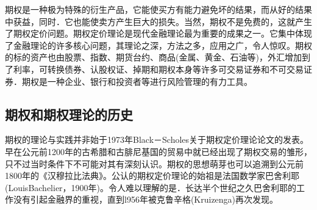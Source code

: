 期权是一种极为特殊的衍生产品，它能使买方有能力避免坏的结果，而从好的结果中获益，同时．它也能使卖方产生巨大的损失。当然，期权不是免费的，这就产生了期权定价问题。期权定价理论是现代金融理论最为重要的成果之一。\cite{optionpricing}它集中体现了金融理论的许多核心问题，其理论之深，方法之多，应用之广，令人惊叹。期权的标的资产也由股票、指数、期货台约、商品(金属、黄金、石油等)，外汇增加到了利率，可转换债券、认股权证、掉期和期权本身等许多可交易证券和不可交易证券．期权是一种企业、银行和投资者等进行风险管理的有力工具。

\subsection{期权和期权理论的历史}
期权的理论与实践并非始于1973年Black－Scholes关于期权定价理论论文的发表。早在公元前1200年的古希腊和古腓尼基国的贸易中就已经出现了期权交易的雏形，只不过当时条件下不可能对其有深刻认识。期权的思想萌芽也可以追溯到公元前1800年的《汉穆拉比法典》。公认的期权定价理论的始祖是法国数学家巴舍利耶 (LouisBachelier，1900年)。令人难以理解的是．长达半个世纪之久巴舍利耶的工作没有引起金融界的重视，直到l956年被克鲁辛格(Kruizenga)再次发现。\cite{kexuebao}

